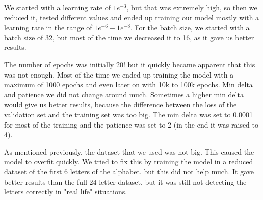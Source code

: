 \documentclass[../paper.tex]{subfiles}
\begin{document}
We started with a learning rate of $1e^{-3}$, but that was extremely high, so then we reduced it, 
tested different values and ended up training our model mostly with a learning rate in the range of $ 1e^{-6} - 1e^{-8}$.
For the batch size, we started with a batch size of 32, 
but most of the time we decreased it to 16, as it gave us better results.

The number of epochs was initially 20! but it quickly became apparent that this was not enough. 
Most of the time we ended up training the model with a maximum of 1000 epochs and even later on with 10k to 100k epochs.
Min delta and patience we did not change around much. 
Sometimes a higher min delta would give us better results, because the difference between the loss of the validation set and the training set was too big.
The min delta was set to 0.0001 for most of the training and the patience was set to 2 (in the end it was raised to 4).

As mentioned previously, the dataset that we used was not big. This caused the model to overfit quickly.
We tried to fix this by training the model in a reduced dataset of the first 6 letters of the alphabet, 
but this did not help much. 
It gave better results than the full 24-letter dataset, but it was still 
not detecting the letters correctly in "real life" situations.
\end{document}
